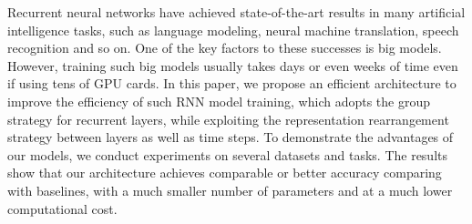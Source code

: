 Recurrent neural networks have achieved state-of-the-art results in many artificial intelligence tasks, such as language modeling, neural machine translation, speech recognition and so on. One of the key factors to these successes is big models. However, training such big models usually takes days or even weeks of time even if using tens of GPU cards. In this paper, we propose an efficient architecture to improve the efficiency of such RNN model training, which adopts the group strategy for recurrent layers, while exploiting the representation rearrangement strategy between layers as well as time steps. To demonstrate the advantages of our models, we conduct experiments on several datasets and tasks. The results show that our architecture achieves comparable or better accuracy comparing with baselines, with a much smaller number of parameters and at a much lower computational cost.
